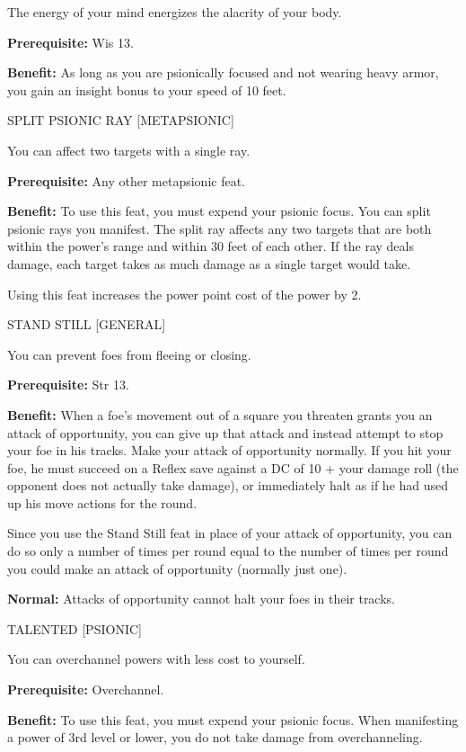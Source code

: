 \documentclass{article}
\begin{document}
The energy of your mind energizes the alacrity of your body.

\textbf{Prerequisite:} Wis 13.

\textbf{Benefit:} As long as you are psionically focused and not wearing heavy 
armor, you gain an insight bonus to your speed of 10 feet.

\vspace{12pt}
SPLIT PSIONIC RAY [METAPSIONIC]

You can affect two targets with a single ray.

\textbf{Prerequisite:} Any other metapsionic feat.

\textbf{Benefit:} To use this feat, you must expend your psionic focus. You can 
split psionic rays you manifest. The split ray affects any two targets that are 
both within the power's range and within 30 feet of each other. If the ray deals 
damage, each target takes as much damage as a single target would take.

Using this feat increases the power point cost of the power by 2.

\vspace{12pt}
STAND STILL [GENERAL]

You can prevent foes from fleeing or closing.

\textbf{Prerequisite:} Str 13.

\textbf{Benefit:} When a foe's movement out of a square you threaten grants you 
an attack of opportunity, you can give up that attack and instead attempt to stop 
your foe in his tracks. Make your attack of opportunity normally. If you hit your 
foe, he must succeed on a Reflex save against a DC of 10 + your damage roll (the 
opponent does not actually take damage), or immediately halt as if he had used 
up his move actions for the round.

Since you use the Stand Still feat in place of your attack of opportunity, you 
can do so only a number of times per round equal to the number of times per round 
you could make an attack of opportunity (normally just one).

\textbf{Normal:} Attacks of opportunity cannot halt your foes in their tracks.

\vspace{12pt}
TALENTED [PSIONIC]

You can overchannel powers with less cost to yourself.

\textbf{Prerequisite:} Overchannel.

\textbf{Benefit:} To use this feat, you must expend your psionic focus. When manifesting 
a power of 3rd level or lower, you do not take damage from overchanneling.
\end{document}
